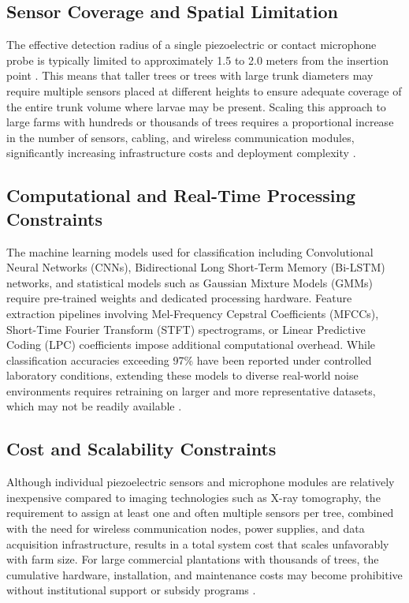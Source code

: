 \documentclass[12pt,a4paper,oneside]{memoir}
\begin{document}
\subsection{Sensor Coverage and Spatial Limitation}
 
The effective detection radius of a single piezoelectric or contact microphone probe is typically limited to approximately 1.5 to 2.0 meters from the insertion point \cite{pinhas2008,karar2022}. This means that taller trees or trees with large trunk diameters may require multiple sensors placed at different heights to ensure adequate coverage of the entire trunk volume where larvae may be present. Scaling this approach to large farms with hundreds or thousands of trees requires a proportional increase in the number of sensors, cabling, and wireless communication modules, significantly increasing infrastructure costs and deployment complexity \cite{pinhas2008,karar2022,saleem2022}.
 
\subsection{Computational and Real-Time Processing Constraints}
 
The machine learning models used for classification including Convolutional Neural Networks (CNNs), Bidirectional Long Short-Term Memory (Bi-LSTM) networks, and statistical models such as Gaussian Mixture Models (GMMs) require pre-trained weights and dedicated processing hardware. Feature extraction pipelines involving Mel-Frequency Cepstral Coefficients (MFCCs), Short-Time Fourier Transform (STFT) spectrograms, or Linear Predictive Coding (LPC) coefficients impose additional computational overhead. While classification accuracies exceeding 97\% have been reported under controlled laboratory conditions, extending these models to diverse real-world noise environments requires retraining on larger and more representative datasets, which may not be readily available \cite{boulila2023,karar2022,saranya2025}.
 
\subsection{Cost and Scalability Constraints}
 
Although individual piezoelectric sensors and microphone modules are relatively inexpensive compared to imaging technologies such as X-ray tomography, the requirement to assign at least one and often multiple sensors per tree, combined with the need for wireless communication nodes, power supplies, and data acquisition infrastructure, results in a total system cost that scales unfavorably with farm size. For large commercial plantations with thousands of trees, the cumulative hardware, installation, and maintenance costs may become prohibitive without institutional support or subsidy programs \cite{karar2022,saleem2022}.
 
\end{document}
